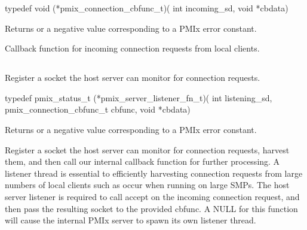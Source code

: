 \cspecificstart
\begin{codepar}
typedef void (*pmix_connection_cbfunc_t)(
                    int incoming_sd, void *cbdata)
\end{codepar}
\cspecificend

\begin{arglist}
\end{arglist}

Returns  or a negative value corresponding to a PMIx error constant.

\descr

Callback function for incoming connection requests from local clients.


\subsection{}

\summary

Register a socket the host server can monitor for connection requests.

\format

\cspecificstart
\begin{codepar}
typedef pmix_status_t (*pmix_server_listener_fn_t)(
                             int listening_sd,
                             pmix_connection_cbfunc_t cbfunc,
                             void *cbdata)
\end{codepar}
\cspecificend

\begin{arglist}
\end{arglist}

Returns  or a negative value corresponding to a PMIx error constant.

\descr

Register a socket the host server can monitor for connection requests, harvest them, and then call our internal callback function for further processing.
A listener thread is essential to efficiently harvesting connection requests from large numbers of local clients such as occur when running on large SMPs.
The host server listener is required to call accept on the incoming connection request, and then pass the resulting socket to the provided cbfunc.
A NULL for this function will cause the internal PMIx server to spawn its own listener thread.


